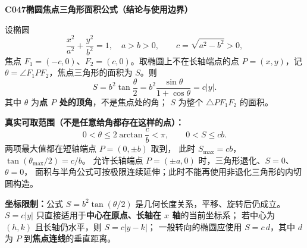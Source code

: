 \begin{statementbox}
\textbf{C047\quad 椭圆焦点三角形面积公式（结论与使用边界）}

设椭圆
\[
 \frac{x^2}{a^2}+\frac{y^2}{b^2}=1,\quad a>b>0,
 \qquad c=\sqrt{a^2-b^2}>0,
\]
焦点 $F_1=(-c,0)$、$F_2=(c,0)$。取椭圆上不在长轴端点的点
$P=(x,y)$，记 $\theta=\angle F_1PF_2$，焦点三角形的面积为 $S$。则
\[
 \boxed{S=b^2\tan\frac{\theta}{2}}
 =\boxed{b^2\frac{\sin\theta}{1+\cos\theta}}
 =\boxed{c|y|}.
\]
其中 $\theta$ 为\textbf{点 $P$ 处的顶角}，不是焦点处的角；
$S$ 为整个 $\triangle PF_1F_2$ 的面积。

\medskip
\textbf{真实可取范围（不是任意给角都存在这样的点）：}
\[
 0<\theta\le 2\arctan\frac cb<\pi,
 \qquad 0<S\le cb.
\]
两项最大值都在短轴端点 $P=(0,\pm b)$ 取到，
此时 $S_{\max}=cb$，$\tan(\theta_{\max}/2)=c/b$。
允许长轴端点 $P=(\pm a,0)$ 时，三角形退化、$S=0$、$\theta=0$，
面积与半角公式可按极限连续延伸；此时不能再使用非退化三角形的内切圆构造。

\medskip
\textbf{坐标限制：}公式 $S=b^2\tan(\theta/2)$ 是几何长度关系，平移、旋转后仍成立。
$S=c|y|$ 只直接适用于\textbf{中心在原点、长轴在 $x$ 轴}的当前坐标系；
若中心为 $(h,k)$ 且长轴仍水平，则 $S=c|y-k|$；
一般转向的椭圆应使用 $S=c\,d$，其中 $d$ 为 $P$ 到\textbf{焦点连线}的垂直距离。
\end{statementbox}
